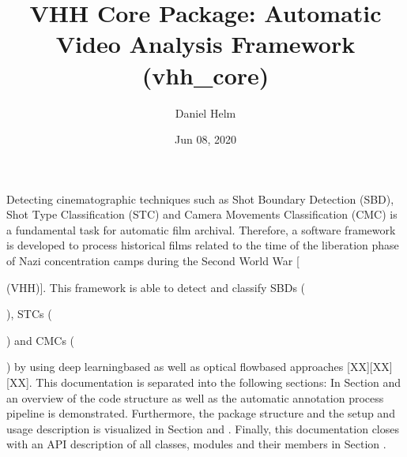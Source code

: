 \documentclass[letterpaper,10pt,english,openany,oneside]{sphinxmanual}
\title{VHH Core Package: Automatic Video Analysis Framework (vhh\_core)}
\date{Jun 08, 2020}
\author{Daniel Helm}
\begin{document}
\pagestyle{empty}
\sphinxmaketitle
\pagestyle{plain}
\sphinxtableofcontents
\pagestyle{normal}
\label{\detokenize{index::doc}}


Detecting cinematographic techniques such as Shot Boundary Detection (SBD), Shot Type Classification (STC) and Camera
Movements Classification (CMC) is a fundamental task for automatic film archival. Therefore, a software framework is
developed to process historical films related to the time of the liberation phase of Nazi concentration camps during
the Second World War {[} %
\begin{footnote}[1]\sphinxAtStartFootnote
{}
%
\end{footnote} (VHH){]}. This framework is able to detect and classify SBDs
( %
\begin{footnote}[3]\sphinxAtStartFootnote
{}
%
\end{footnote}), STCs ( %
\begin{footnote}[4]\sphinxAtStartFootnote
{}
%
\end{footnote}) and CMCs ( %
\begin{footnote}[5]\sphinxAtStartFootnote
{}
%
\end{footnote}) by using deep learning\sphinxhyphen{}based as well as optical flow\sphinxhyphen{}based
approaches {[}XX{]}{[}XX{]}{[}XX{]}. This documentation is separated into the following sections: In Section  and
 an overview of the code structure as well as the automatic annotation process pipeline is demonstrated.
Furthermore, the package structure and the setup and usage description is visualized in Section  and
. Finally, this documentation closes with an API description of all classes, modules and their
members in Section .
\end{document}
